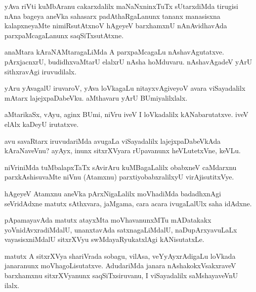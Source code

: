 \documentclass{article}
\begin{document}
\begin{mn}
yAva riVti kuMbAranu cakarxdalilx maNaNxninxTuTx sUtarxdiMda tirugisi nAna 
bageya aneVka sahasarx padAthaRgaLanunx tananx manasisxna kalapxneyaMte 
nimiRsutAtxnoV hAgeyeV barxhamxnU nAnAvidhavAda parxpaMcagaLanunx saqSiTxsutAtxne.
\end{mn}

\begin{mn}
anaMtara kAraNAMtaragaLiMda A parxpaMcagaLu nAshavAgutatxve. pArxjacnxrU,
 budidhxvaMtarU elalxrU nAsha hoMduvaru.  nAshavAgadeV  yArU sithxravAgi iruvudilalx.
\end{mn}

\begin{mn}
yAru yAvagalU iruvaroV, yAva loVkagaLu nitayxvAgiveyoV avara viSayadalilx  
mAtarx lajejxpaDabeVku. aMthavaru yArU BUmiyalilxlalx.
\end{mn}

\begin{mn}
aMtarikaSx, vAyu, aginx BUmi, niVru iveV I loVkadalilx kANabarutatxve.  
iveV elAlx kaDeyU irutatxve.
\end{mn}

\begin{mn}
avu savaRtarx iruvudariMda avugaLa viSayadalilx lajejxpaDabeVkAda kAraNaveVnu? 
ayAyx, inunx sitxrXVyara rUpavanunx heVLutetxVne, keVLu.
\end{mn}

\begin{mn}
niVriniMda  tuMbalapxTaTx sAvirAru kuMBagaLalilx obabxneV caMdarxnu
 parxkAshisuvaMte niVnu (Atamxnu) parxtiyobabxralilxyU virAjisutitxVye.
\end{mn}

\begin{mn}
hAgeyeV  Atamxnu aneVka pArxNigaLalilx  moVhadiMda badadhxnAgi seVridAdxne 
matutx  sAthxvara, jaMgama, cara acara ivugaLalUlx saha idAdxne. 
\end{mn}

\begin{mn}
pApamayavAda matutx atayxMta moVhavanunxMTu mADatakakx yoVnidAvxradiMdalU,
 unanxtavAda satxnagaLiMdalU, naDupArxyavuLaLx vayasisxniMdalU sitxrXVyu
 swMdayaRyukatxlAgi kANisutatxLe.
\end{mn}

\begin{mn}
matutx A sitxrXVya shariVrada sobagu,  vilAsa, veYyAyxrAdigaLu loVkada janaranunx 
moVhagoLisutatxve.  AdudariMda janara nAshakokxVsakxraveV  barxhamxnu 
sitxrXVyanunx saqSiTxsiruvanu,  I viSayadalilx saMshayaveVnU ilalx.
\end{mn}
\end{document}
